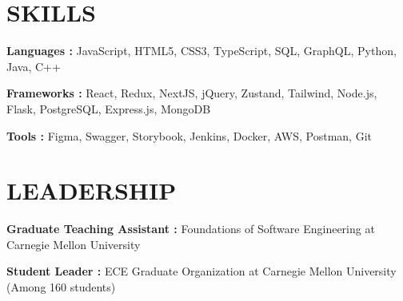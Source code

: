 \documentclass[letterpaper]{article}
\newcommand{\shortSection}[1]{
    \vspace{-6pt}
    \section{#1}
}
\newcommand*{\skill}[2]{
  \textbf{#1 : }#2 \\
  \vspace{1pt}
}
\begin{document}
\shortSection{SKILLS}
\skill {Languages\hspace{8pt}}{JavaScript, HTML5, CSS3, TypeScript, SQL, GraphQL, Python, Java, C++}
\skill {Frameworks}{React, Redux, NextJS, jQuery, Zustand, Tailwind, Node.js, Flask, PostgreSQL, Express.js, MongoDB}
\skill {Tools\hspace{34pt}}{Figma, Swagger, Storybook, Jenkins, Docker, AWS, Postman, Git}



\shortSection{LEADERSHIP}
\skill{Graduate Teaching Assistant}{Foundations of Software Engineering at Carnegie Mellon University}
\skill{Student Leader}{ECE Graduate Organization at Carnegie Mellon University (Among 160 students)}
\end{document}

